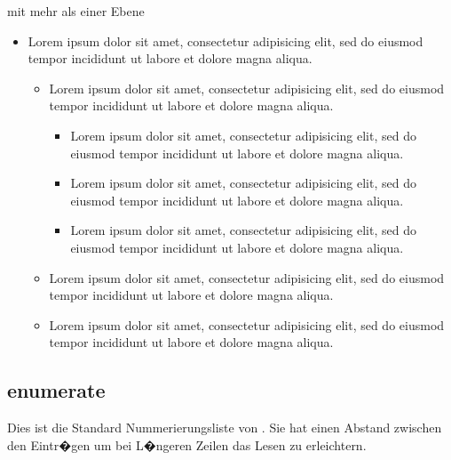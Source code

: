 mit mehr als einer Ebene

\begin{itemize}
   \item Lorem ipsum dolor sit amet, consectetur adipisicing elit, sed do eiusmod tempor
         incididunt ut labore et dolore magna aliqua.
         \begin{itemize}
            \item Lorem ipsum dolor sit amet, consectetur adipisicing elit, sed do eiusmod tempor
                  incididunt ut labore et dolore magna aliqua.
                  \begin{itemize}
                     \item Lorem ipsum dolor sit amet, consectetur adipisicing elit, sed do eiusmod tempor
                           incididunt ut labore et dolore magna aliqua.
                     \item Lorem ipsum dolor sit amet, consectetur adipisicing elit, sed do eiusmod tempor
                           incididunt ut labore et dolore magna aliqua.
                     \item Lorem ipsum dolor sit amet, consectetur adipisicing elit, sed do eiusmod tempor
                           incididunt ut labore et dolore magna aliqua.
                  \end{itemize}
            \item Lorem ipsum dolor sit amet, consectetur adipisicing elit, sed do eiusmod tempor
                  incididunt ut labore et dolore magna aliqua.
            \item Lorem ipsum dolor sit amet, consectetur adipisicing elit, sed do eiusmod tempor
                  incididunt ut labore et dolore magna aliqua.
         \end{itemize}
\end{itemize}

\subsection{enumerate}
Dies ist die Standard Nummerierungsliste von \LaTeXe{}. Sie hat einen Abstand
zwischen den Eintr�gen um bei L�ngeren Zeilen das Lesen zu erleichtern.

